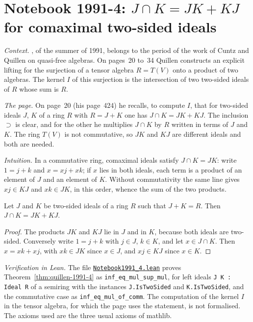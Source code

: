 \section[Notebook 1991-4: $J \cap K = JK + KJ$ for comaximal ideals]{Notebook 1991-4: $J \cap K = JK + KJ$ for comaximal two-sided ideals\protect{}}\label{sec:quillen-1991-4}

\emph{Context.} , of the summer of 1991, belongs to the period of the work of Cuntz and Quillen on quasi-free algebras. On pages~20 to~34 Quillen constructs an explicit lifting for the surjection of a tensor algebra $R = T(V)$ onto a product of two algebras. The kernel $I$ of this surjection is the intersection of two two-sided ideals of $R$ whose sum is $R$.

\emph{The page.} On page~20 (his page~424) he recalls, to compute $I$, that for two-sided ideals $J$, $K$ of a ring $R$ with $R = J + K$ one has $J \cap K = JK + KJ$. The inclusion $\supset$ is clear, and for the other he multiplies $J \cap K$ by $R$ written in terms of $J$ and $K$. The ring $T(V)$ is not commutative, so $JK$ and $KJ$ are different ideals and both are needed.

\emph{Intuition.} In a commutative ring, comaximal ideals satisfy $J \cap K = JK$: write $1 = j + k$ and $x = xj + xk$; if $x$ lies in both ideals, each term is a product of an element of $J$ and an element of $K$. Without commutativity the same line gives $xj \in KJ$ and $xk \in JK$, in this order, whence the sum of the two products.

\begin{encadre}
\begin{theoreme}\label{thm:quillen-1991-4}
Let $J$ and $K$ be two-sided ideals of a ring $R$ such that $J + K = R$. Then $J \cap K = JK + KJ$.
\end{theoreme}
\end{encadre}

\begin{proof}
The products $JK$ and $KJ$ lie in $J$ and in $K$, because both ideals are two-sided. Conversely write $1 = j + k$ with $j \in J$, $k \in K$, and let $x \in J \cap K$. Then $x = xk + xj$, with $xk \in JK$ since $x \in J$, and $xj \in KJ$ since $x \in K$.
\end{proof}

\emph{Verification in Lean.} The file \href{\leanblobmain/Notebook1991_4.lean}{\texttt{Notebook1991\_4.\allowbreak{}lean}} proves Theorem~\ref{thm:quillen-1991-4} as \texttt{inf\_eq\_mul\_sup\_mul}, for left ideals \texttt{J K : Ideal R} of a semiring with the instances \texttt{J.IsTwoSided} and \texttt{K.IsTwoSided}, and the commutative case as \texttt{inf\_eq\_mul\_of\_comm}. The computation of the kernel $I$ in the tensor algebra, for which the page uses the statement, is not formalised. The axioms used are the three usual axioms of mathlib.

